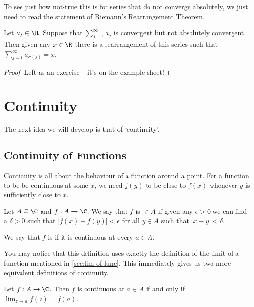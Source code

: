 To see just how not-true this is for series that do not converge absolutely, we just need to read the statement of Riemann's Rearrangement Theorem.

\begin{theorem}
	Let $a_j \in \R$. Suppose that $\sum_{j = 1}^{\infty} a_j$ is convergent but not absolutely convergent. Then given any $x \in \R$ there is a rearrangement of this series such that $\sum_{j = 1}^{\infty} a_{\sigma(j)} = x$.
\end{theorem}
\begin{proof}
	Left as an exercise -- it's on the example sheet!
\end{proof}

\clearpage
\section{Continuity}

The next idea we will develop is that of `continuity'. 

\subsection{Continuity of Functions}

Continuity is all about the behaviour of a function around a point. For a function to be be continuous at some $x$, we need $f(y)$ to be close to $f(x)$ whenever $y$ is sufficiently close to $x$.

\begin{definition}[Continuity]
	Let $A \subseteq \C$ and $f: A \rightarrow \C$. We say that $f$ is  $\in A$ if given any $\epsilon > 0$ we can find a $\delta > 0$ such that $|f(x) - f(y)| < \epsilon$ for all $y \in A$ such that $|x - y| < \delta$.


	We say that $f$ is  if it is continuous at every $a \in A$.
\end{definition}

You may notice that this definition uses exactly the definition of the limit of a function mentioned in \autoref{sec:lim-of-func}. This immediately gives us two more equivalent definitions of continuity.

\begin{proposition}
	Let $f: A \rightarrow \C$. Then $f$ is continuous at $a \in A$ if and only if $\displaystyle \lim_{z \to a} f(z) = f(a)$.
\end{proposition}


